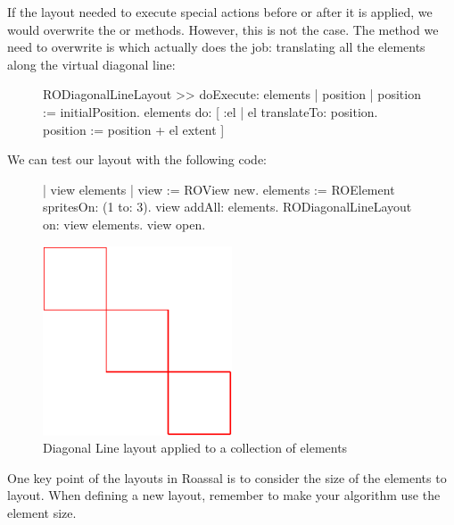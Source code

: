 \documentclass[a4paper,10pt,twoside]{book}
\begin{document}
If the layout needed to execute special actions before or after it is applied, we would overwrite the  or  methods. However, this is not the case. 
The method we need to overwrite is  which actually does the job: translating all the elements along the virtual diagonal line:

\begin{figure}[H]
\begin{code}{}
RODiagonalLineLayout >> doExecute: elements
	| position |	
	position := initialPosition.
	elements do: [ :el | 
		el translateTo: position.
		position := position + el extent ] 
\end{code}
\end{figure}

We can test our layout with the following code:

\begin{figure}[H]
      \begin{minipage}[t]{0.61\textwidth}
      \vspace{0pt}
\begin{code}{}
| view elements |
view := ROView new.
elements := ROElement spritesOn: (1 to: 3).
view addAll: elements.
RODiagonalLineLayout on: view elements.
view open.
\end{code}
   \end{minipage}
   \hfill
   \begin{minipage}[t]{0.5\textwidth}
      \vspace{0pt}\raggedright
       \centering
		\includegraphics[width=0.5\textwidth]{diagonalLineLayout}
   \end{minipage}
\label{fig:diagonalLineLayout}
\caption{Diagonal Line layout applied to a collection of elements}
\end{figure} 

One key point of the layouts in Roassal is to consider the size of the elements to layout. When defining a new layout, remember to make your algorithm use the element size.
\end{document}
